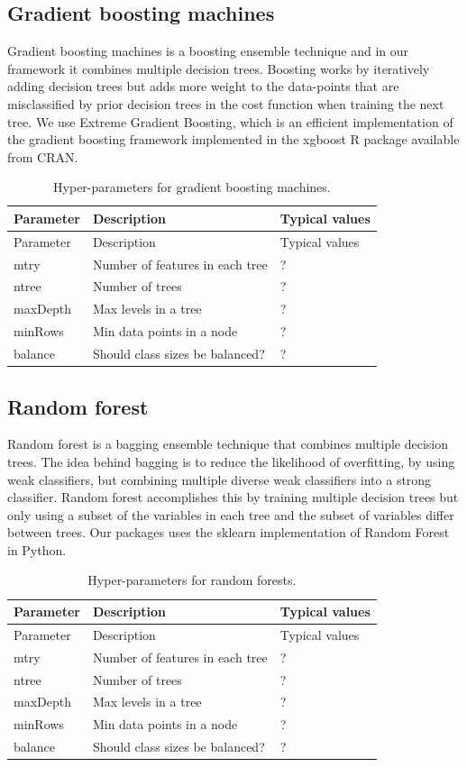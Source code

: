 \documentclass[11pt]{book}
\theoremstyle{definition}
\theoremstyle{definition}
\theoremstyle{definition}
\theoremstyle{remark}
\begin{document}
\hypertarget{gradient-boosting-machines}{%
\subsection{Gradient boosting machines}\label{gradient-boosting-machines}}

Gradient boosting machines is a boosting ensemble technique and in our framework it combines multiple decision trees. Boosting works by iteratively adding decision trees but adds more weight to the data-points that are misclassified by prior decision trees in the cost function when training the next tree. We use Extreme Gradient Boosting, which is an efficient implementation of the gradient boosting framework implemented in the xgboost R package available from CRAN.

\begin{longtable}[]{@{}lll@{}}
\caption{\label{tab:gbmParameters} Hyper-parameters for gradient boosting machines.}\tabularnewline
\toprule
Parameter & Description & Typical values\tabularnewline
\midrule
\endfirsthead
\toprule
Parameter & Description & Typical values\tabularnewline
\midrule
\endhead
mtry & Number of features in each tree & ?\tabularnewline
ntree & Number of trees & ?\tabularnewline
maxDepth & Max levels in a tree & ?\tabularnewline
minRows & Min data points in a node & ?\tabularnewline
balance & Should class sizes be balanced? & ?\tabularnewline
\bottomrule
\end{longtable}

\hypertarget{random-forest}{%
\subsection{Random forest}\label{random-forest}}

Random forest is a bagging ensemble technique that combines multiple decision trees. The idea behind bagging is to reduce the likelihood of overfitting, by using weak classifiers, but combining multiple diverse weak classifiers into a strong classifier. Random forest accomplishes this by training multiple decision trees but only using a subset of the variables in each tree and the subset of variables differ between trees. Our packages uses the sklearn implementation of Random Forest in Python.

\begin{longtable}[]{@{}lll@{}}
\caption{\label{tab:randomForestParameters} Hyper-parameters for random forests.}\tabularnewline
\toprule
Parameter & Description & Typical values\tabularnewline
\midrule
\endfirsthead
\toprule
Parameter & Description & Typical values\tabularnewline
\midrule
\endhead
mtry & Number of features in each tree & ?\tabularnewline
ntree & Number of trees & ?\tabularnewline
maxDepth & Max levels in a tree & ?\tabularnewline
minRows & Min data points in a node & ?\tabularnewline
balance & Should class sizes be balanced? & ?\tabularnewline
\bottomrule
\end{longtable}
\end{document}
